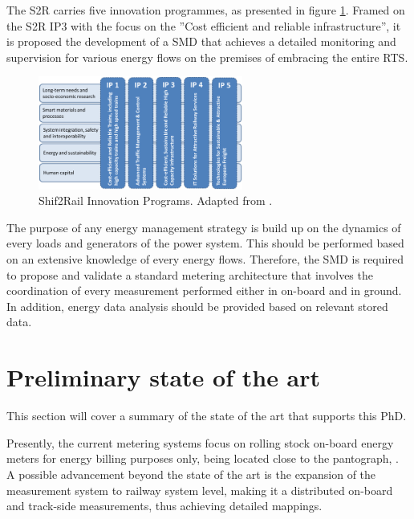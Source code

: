 

The \ac{S2R} carries five innovation programmes, as presented in figure \ref{fig:ips}. Framed on the S2R \ac{IP3} with the focus on the ”Cost efficient and reliable infrastructure”, it is proposed the development of a \ac{SMD} that achieves a detailed monitoring and supervision for various energy flows on the premises of embracing the entire \ac{RTS}.

\begin{figure}[h!]
	\centering
	\includegraphics[width=0.60\textwidth,keepaspectratio]{figures/1.Intro/IPs}
	\caption{Shif2Rail Innovation Programs. Adapted from  \cite{shift2rail2015}.}
	\label{fig:ips}
\end{figure}

The purpose of any energy management strategy is build up on the dynamics of every loads and generators of the power system. 
This should be performed based on an extensive knowledge of every energy flows. 
Therefore, the \ac{SMD} is required to propose and validate a standard metering architecture that involves the coordination of every measurement performed either in on-board and in ground. 
In addition, energy data analysis should be provided based on relevant stored data. 

\section{Preliminary state of the art}

This section will cover a summary of the state of the art that supports this PhD.

Presently, the current metering systems focus on rolling stock on-board energy meters for energy billing purposes only, being located close to the pantograph, \cite{shift2rail2015}.
A possible advancement beyond the state of the art is the expansion of the measurement system to railway system level, making it a distributed on-board and track-side measurements, thus achieving detailed mappings. 

